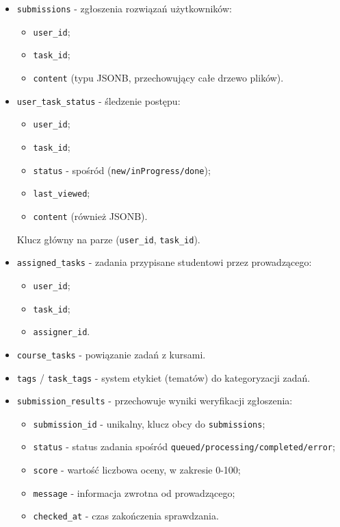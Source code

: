 \documentclass[12pt,a4paper]{article}
\begin{document}
\begin{itemize}
    \begin{itemize}
        \item \texttt{file\_path} (np. \texttt{root/index.html});
        \item \texttt{language};
        \item \texttt{content}.
    \end{itemize}
    \item \texttt{submissions} - zgłoszenia rozwiązań użytkowników: 
    \begin{itemize}
        \item \texttt{user\_id};
        \item \texttt{task\_id};
        \item \texttt{content} (typu JSONB, przechowujący całe drzewo plików).
    \end{itemize}
    \item \texttt{user\_task\_status} - śledzenie postępu: 
    \begin{itemize}
        \item \texttt{user\_id};
        \item \texttt{task\_id};
        \item \texttt{status} - spośród (\texttt{new/inProgress/done});
        \item \texttt{last\_viewed};
        \item \texttt{content} (również JSONB). 
    \end{itemize}
    Klucz główny na parze (\texttt{user\_id}, \texttt{task\_id}).
    \item \texttt{assigned\_tasks} - zadania przypisane studentowi przez prowadzącego: 
    \begin{itemize}
        \item \texttt{user\_id};
        \item \texttt{task\_id};
        \item \texttt{assigner\_id}.
    \end{itemize}
    \item \texttt{course\_tasks} - powiązanie zadań z kursami.
    
    \item \texttt{tags} / \texttt{task\_tags} - system etykiet (tematów) do kategoryzacji zadań.
    \item \texttt{submission\_results} - przechowuje wyniki weryfikacji zgłoszenia: 
    \begin{itemize}
        \item \texttt{submission\_id} - unikalny, klucz obcy do \texttt{submissions};
        \item \texttt{status} - status zadania spośród \texttt{queued/processing/completed/error};
        \item \texttt{score} - wartość liczbowa oceny, w zakresie 0-100;
        \item \texttt{message} - informacja zwrotna od prowadzącego;
        \item \texttt{checked\_at} - czas zakończenia sprawdzania.
    \end{itemize}
\end{itemize}
\end{document}
